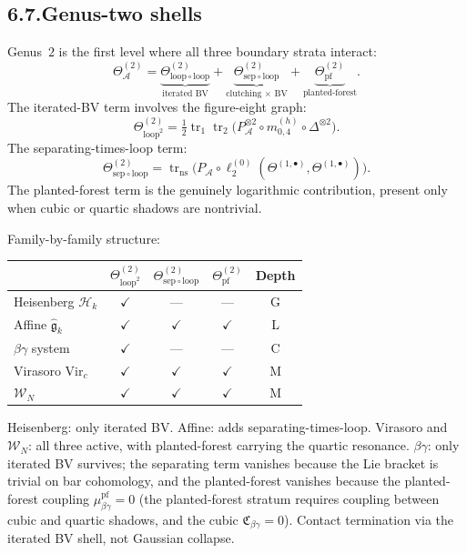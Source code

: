 \documentclass[11pt,reqno]{amsart}
\theoremstyle{definition}
\theoremstyle{remark}
\providecommand{\cA}{\mathcal{A}}
\providecommand{\cH}{\mathcal{H}}
\providecommand{\fg}{\mathfrak{g}}
\numberwithin{equation}{section}
\begin{document}
\subsection*{6.7.\enspace Genus-two shells}

Genus~$2$ is the first level where all three boundary strata interact:
\[
\Theta^{(2)}_\cA=\underbrace{\Theta^{(2)}_{\mathrm{loop}\circ\mathrm{loop}}}_{\text{iterated BV}}+\underbrace{\Theta^{(2)}_{\mathrm{sep}\circ\mathrm{loop}}}_{\text{clutching $\times$ BV}}+\underbrace{\Theta^{(2)}_{\mathrm{pf}}}_{\text{planted-forest}}.
\]
The iterated-BV term involves the figure-eight graph:
\[
\Theta^{(2)}_{\mathrm{loop}^2}=\tfrac12\operatorname{tr}_1\operatorname{tr}_2\bigl(P_\cA^{\otimes 2}\circ m^{(h)}_{0,4}\circ\Delta^{\otimes 2}\bigr).
\]
The separating-times-loop term:
\[
\Theta^{(2)}_{\mathrm{sep}\circ\mathrm{loop}}=\operatorname{tr}_{\mathrm{ns}}\bigl(P_\cA\circ\ell_2^{(0)}(\Theta^{(1,\bullet)},\Theta^{(1,\bullet)})\bigr).
\]
The planted-forest term is the genuinely logarithmic contribution,
present only when cubic or quartic shadows are nontrivial.

\medskip
\noindent
Family-by-family structure:

\begin{center}
\renewcommand{\arraystretch}{1.2}
\begin{tabular}{lcccc}
& $\Theta^{(2)}_{\mathrm{loop}^2}$ & $\Theta^{(2)}_{\mathrm{sep}\circ\mathrm{loop}}$ & $\Theta^{(2)}_{\mathrm{pf}}$ & \textbf{Depth}\\
\hline
Heisenberg $\cH_k$ & $\checkmark$ & --- & --- & G\\
Affine $\widehat{\fg}_k$ & $\checkmark$ & $\checkmark$ & $\checkmark$ & L\\
$\beta\gamma$ system & $\checkmark$ & --- & --- & C\\
Virasoro $\mathrm{Vir}_c$ & $\checkmark$ & $\checkmark$ & $\checkmark$ & M\\
$\mathcal W_N$ & $\checkmark$ & $\checkmark$ & $\checkmark$ & M
\end{tabular}
\end{center}

Heisenberg: only iterated BV. Affine: adds separating-times-loop.
Virasoro and $\mathcal W_N$: all three active, with planted-forest
carrying the quartic resonance. $\beta\gamma$: only iterated BV
survives; the separating term vanishes because the Lie bracket is
trivial on bar cohomology, and the planted-forest vanishes because
the planted-forest coupling $\mu^{\mathrm{pf}}_{\beta\gamma}=0$
(the planted-forest stratum requires coupling between cubic and quartic
shadows, and the cubic $\mathfrak{C}_{\beta\gamma}=0$). Contact
termination via the iterated BV shell, not Gaussian collapse.
\end{document}
